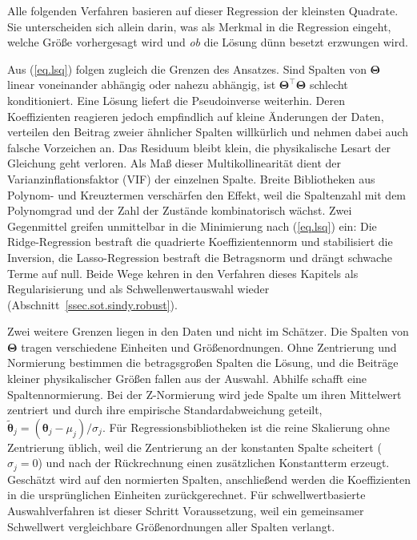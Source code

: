 Alle folgenden Verfahren basieren auf dieser Regression der kleinsten Quadrate. Sie unterscheiden sich allein darin, was als
Merkmal in die Regression eingeht, welche Größe vorhergesagt wird
und \emph{ob} die Lösung dünn besetzt erzwungen wird.


Aus (\ref{eq.lsq}) folgen zugleich die Grenzen des Ansatzes. Sind Spalten
von $\boldsymbol\Theta$ linear voneinander abhängig oder nahezu abhängig,
ist $\boldsymbol\Theta^{\!\top}\boldsymbol\Theta$ schlecht konditioniert.
Eine Lösung liefert die Pseudoinverse weiterhin. Deren Koeffizienten
reagieren jedoch empfindlich auf kleine Änderungen der Daten, verteilen den
Beitrag zweier ähnlicher Spalten willkürlich und nehmen dabei auch falsche
Vorzeichen an. Das Residuum bleibt klein, die physikalische Lesart der
Gleichung geht verloren. Als Maß dieser Multikollinearität dient der
Varianzinflationsfaktor (VIF) der einzelnen Spalte. Breite Bibliotheken aus
Polynom- und Kreuztermen verschärfen den Effekt, weil die Spaltenzahl mit
dem Polynomgrad und der Zahl der Zustände kombinatorisch wächst. Zwei
Gegenmittel greifen unmittelbar in die Minimierung nach (\ref{eq.lsq}) ein:
Die Ridge-Regression bestraft die quadrierte Koeffizientennorm und
stabilisiert die Inversion, die Lasso-Regression bestraft die Betragsnorm
und drängt schwache Terme auf null. Beide Wege kehren in den Verfahren
dieses Kapitels als Regularisierung und als Schwellenwertauswahl wieder
(Abschnitt~\ref{ssec.sot.sindy.robust}).


Zwei weitere Grenzen liegen in den Daten und nicht im Schätzer. Die Spalten
von $\boldsymbol\Theta$ tragen verschiedene Einheiten und Größenordnungen.
Ohne Zentrierung und Normierung bestimmen die betragsgroßen Spalten die
Lösung, und die Beiträge kleiner physikalischer Größen fallen aus der
Auswahl. Abhilfe schafft eine Spaltennormierung. Bei der Z-Normierung
wird jede Spalte um ihren Mittelwert zentriert und durch ihre empirische
Standardabweichung geteilt,
$\tilde{\boldsymbol\theta}_j = (\boldsymbol\theta_j - \mu_j)/\sigma_j$.
Für Regressionsbibliotheken ist die reine Skalierung ohne Zentrierung
üblich, weil die Zentrierung an der konstanten Spalte scheitert
($\sigma_j = 0$) und nach der Rückrechnung einen zusätzlichen
Konstantterm erzeugt. Geschätzt wird auf den normierten Spalten,
anschließend werden die Koeffizienten in die ursprünglichen Einheiten
zurückgerechnet. Für schwellwertbasierte Auswahlverfahren ist dieser
Schritt Voraussetzung, weil ein gemeinsamer Schwellwert vergleichbare
Größenordnungen aller Spalten verlangt.

